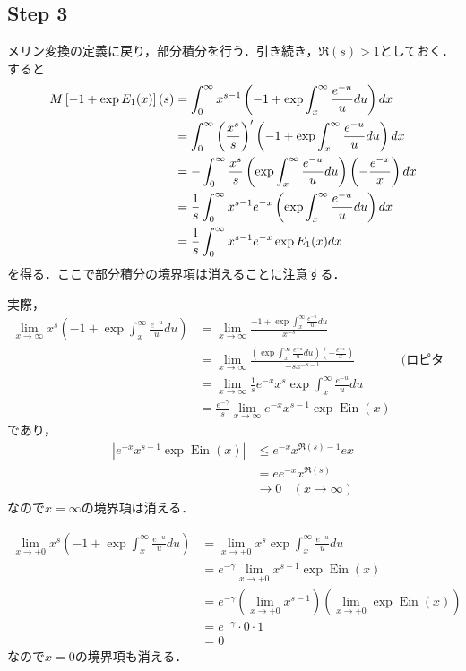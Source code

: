 \documentclass{jsarticle}
\newcommand{\Ein}{\operatorname{Ein}}
\theoremstyle{definition}
\begin{document}
\subsection*{Step 3}
メリン変換の定義に戻り，部分積分を行う．引き続き，$\Re(s)>1$としておく．すると
\begin{align}
M\left[ -1 + \exp E_1(x) \right](s) &= \int_0^\infty x^{s-1} \left(-1 + \exp \int_{x}^\infty \frac{e^{-u}}{u} du\right) dx \notag \\
&= \int_0^\infty \left(\frac{x^s}{s}\right)' \left(-1 + \exp \int_{x}^\infty \frac{e^{-u}}{u} du\right) dx \notag \\
&= - \int_0^\infty \frac{x^s}{s} \left( \exp \int_{x}^\infty \frac{e^{-u}}{u} du\right) \left(-\frac{e^{-x}}{x}\right) dx \notag \\
&= \frac{1}{s} \int_0^\infty x^{s-1} e^{-x} \left( \exp \int_{x}^\infty \frac{e^{-u}}{u} du\right) dx \notag \\
&= \frac{1}{s} \int_0^\infty x^{s-1} e^{-x} \exp E_1(x) dx \label{step3_conclusion}
\end{align}
を得る．ここで部分積分の境界項は消えることに注意する．

実際，
\begin{align*}
\lim_{x\to\infty} x^s (-1+\exp \int_x^\infty \frac{e^{-u}}{u}du)
&= \lim_{x\to\infty} \frac{-1+\exp \int_x^\infty \frac{e^{-u}}{u}du}{x^{-s}} \\
&= \lim_{x\to\infty} \frac{(\exp \int_x^\infty \frac{e^{-u}}{u}du) (-\frac{e^{-x}}{x})}{-s x^{-s-1}}  & \text{(ロピタル)} \\
&= \lim_{x\to\infty} \frac{1}{s} e^{-x} x^{s} \exp \int_x^\infty \frac{e^{-u}}{u}du \\
&= \frac{e^{-\gamma}}{s} \lim_{x\to\infty} e^{-x} x^{s-1} \exp \Ein(x)
\end{align*}
であり，
\begin{align*}
|e^{-x} x^{s-1} \exp \Ein(x)| &\le e^{-x} x^{\Re(s)-1} e x \\
&= e e^{-x} x^{\Re(s)} \\
&\to 0 \ \ \ \ (x \to \infty)
\end{align*}
なので$x=\infty$の境界項は消える．

\begin{align*}
\lim_{x\to +0} x^s (-1+\exp \int_x^\infty \frac{e^{-u}}{u}du)
&= \lim_{x\to +0} x^s \exp \int_x^\infty \frac{e^{-u}}{u}du \\
&= e^{-\gamma} \lim_{x\to +0} x^{s-1} \exp \Ein(x) \\
&= e^{-\gamma} (\lim_{x\to +0} x^{s-1}) (\lim_{x\to +0} \exp \Ein(x)) \\
&= e^{-\gamma} \cdot 0 \cdot 1 \\
&= 0
\end{align*}
なので$x=0$の境界項も消える．
\end{document}
